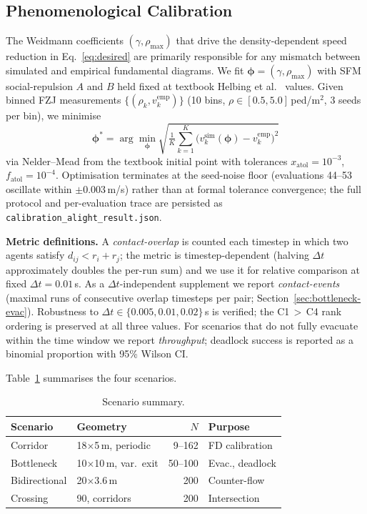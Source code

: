 \documentclass[a4paper,twoside]{article}
\begin{document}
\subsection{Phenomenological Calibration}
\label{sec:calibration}

The Weidmann coefficients $(\gamma,\rho_{\max})$ that drive the density-dependent speed reduction in Eq.~\eqref{eq:desired} are primarily responsible for any mismatch between simulated and empirical fundamental diagrams. We fit $\boldsymbol{\phi}=(\gamma,\rho_{\max})$ with SFM social-repulsion $A$ and $B$ held fixed at textbook Helbing et al.~\cite{Helbing00} values. Given binned FZJ measurements $\{(\rho_k,v_k^{\text{emp}})\}$ (10 bins, $\rho\in[0.5,5.0]$\,ped/m$^2$, 3 seeds per bin), we minimise
\begin{equation}\label{eq:calibration}
\boldsymbol{\phi}^* = \arg\min_{\boldsymbol{\phi}} \sqrt{\tfrac{1}{K}\sum_{k=1}^{K}\bigl(v_k^{\text{sim}}(\boldsymbol{\phi})-v_k^{\text{emp}}\bigr)^2}
\end{equation}
via Nelder--Mead from the textbook initial point with tolerances $x_{\text{atol}}{=}10^{-3}$, $f_{\text{atol}}{=}10^{-4}$. Optimisation terminates at the seed-noise floor (evaluations 44--53 oscillate within $\pm 0.003$\,m/s) rather than at formal tolerance convergence; the full protocol and per-evaluation trace are persisted as \texttt{calibration\_alight\_result.json}.

\textbf{Metric definitions.}
A \emph{contact-overlap} is counted each timestep in which two agents satisfy $d_{ij}<r_i+r_j$; the metric is timestep-dependent (halving $\Delta t$ approximately doubles the per-run sum) and we use it for relative comparison at fixed $\Delta t=0.01$\,s. As a $\Delta t$-independent supplement we report \emph{contact-events} (maximal runs of consecutive overlap timesteps per pair; Section~\ref{sec:bottleneck-evac}). Robustness to $\Delta t\in\{0.005,0.01,0.02\}$\,s is verified; the C1\,$>$\,C4 rank ordering is preserved at all three values. For scenarios that do not fully evacuate within the time window we report \emph{throughput}; deadlock success is reported as a binomial proportion with 95\% Wilson CI.

Table~\ref{tab:scenarios} summarises the four scenarios.

\begin{table}[h]
\caption{Scenario summary.}\label{tab:scenarios}
\centering\scriptsize
\begin{tabular}{@{}llrl@{}}
\toprule
\textbf{Scenario} & \textbf{Geometry} & $N$ & \textbf{Purpose} \\
\midrule
Corridor & 18$\times$5\,m, periodic & 9--162 & FD calibration \\
Bottleneck & 10$\times$10\,m, var.\ exit & 50--100 & Evac., deadlock \\
Bidirectional & 20$\times$3.6\,m & 200 & Counter-flow \\
Crossing & 90\textdegree{}, corridors & 200 & Intersection \\
\bottomrule
\end{tabular}
\end{table}
\end{document}
